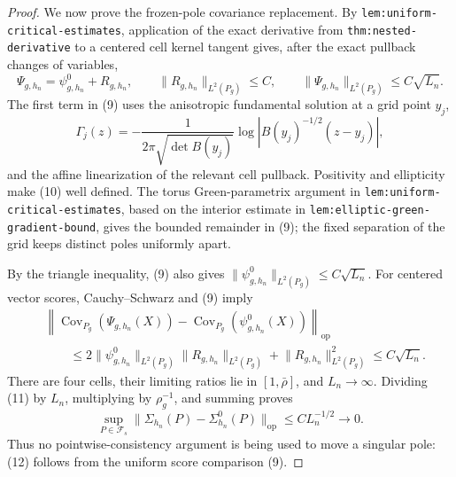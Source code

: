 \documentclass{article}
\begin{document}
\begin{proof}
We now prove the frozen-pole covariance replacement.  By
\texttt{lem:uniform-critical-estimates}, application of the exact derivative from
\texttt{thm:nested-derivative} to a centered cell kernel tangent gives, after the exact pullback changes of variables,
\[
 \Psi_{g,h_n}=\psi^0_{g,h_n}+R_{g,h_n},
 \qquad
 \lVert R_{g,h_n}\rVert_{L^2(P_g)}\leq C,
 \qquad
 \lVert\Psi_{g,h_n}\rVert_{L^2(P_g)}\leq C\sqrt{L_n}.
\tag{9}
\]
The first term in (9) uses the anisotropic fundamental solution at a grid point \(y_j\),
\[
 \Gamma_j(z)=-\frac{1}{2\pi\sqrt{\det B(y_j)}}
 \log\left|B(y_j)^{-1/2}(z-y_j)\right|,
\tag{10}
\]
and the affine linearization of the relevant cell pullback.  Positivity and ellipticity make (10) well defined.  The torus Green-parametrix argument in
\texttt{lem:uniform-critical-estimates}, based on the interior estimate in
\texttt{lem:elliptic-green-gradient-bound}, gives the bounded remainder in (9); the fixed separation of the grid keeps distinct poles uniformly apart.

By the triangle inequality, (9) also gives
\(\lVert\psi^0_{g,h_n}\rVert_{L^2(P_g)}\leq C\sqrt{L_n}\).  For centered vector scores, Cauchy--Schwarz and (9) imply
\[
 \begin{aligned}
 &\left\lVert
 \operatorname{Cov}_{P_g}(\Psi_{g,h_n}(X))
 -\operatorname{Cov}_{P_g}(\psi^0_{g,h_n}(X))
 \right\rVert_{\mathrm{op}}\\
 &\qquad\leq
 2\lVert\psi^0_{g,h_n}\rVert_{L^2(P_g)}
   \lVert R_{g,h_n}\rVert_{L^2(P_g)}
 +\lVert R_{g,h_n}\rVert_{L^2(P_g)}^2
 \leq C\sqrt{L_n}.
\end{aligned}
\tag{11}
\]
There are four cells, their limiting ratios lie in \([1,\bar\rho]\), and \(L_n\to\infty\).  Dividing (11) by \(L_n\), multiplying by \(\rho_g^{-1}\), and summing proves
\[
 \sup_{P\in\mathcal F_s}
 \lVert\Sigma_{h_n}(P)-\Sigma^0_{h_n}(P)\rVert_{\mathrm{op}}
 \leq C L_n^{-1/2}\longrightarrow0.
\tag{12}
\]
Thus no pointwise-consistency argument is being used to move a singular pole: (12) follows from the uniform score comparison (9).


\end{proof}
\end{document}
